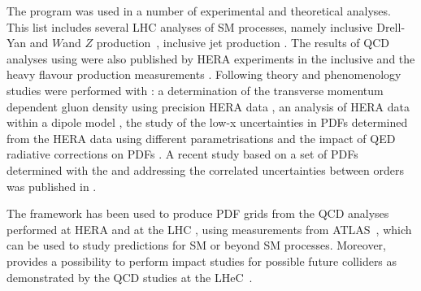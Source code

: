 The \fitter program was used in a number of experimental and theoretical analyses. 
This list includes several LHC analyses of SM processes, namely
inclusive Drell-Yan and $W$and $Z$ production~\cite{atlas:strange,atlas:hm,cms:strange},
inclusive jet production \cite{atlas:jets}.
The results of QCD analyses using \fitter were also
published by HERA experiments in the inclusive \cite{h1:2012kk} and
the heavy flavour production measurements \cite{h1zeus:charm, Abramowicz:2014zub}.
Following theory and phenomenology studies were performed with \fitter:
a determination of the transverse momentum dependent gluon density using precision HERA data \cite{Jung2014}, 
an analysis of HERA data within a dipole model \cite{Luszczak:2013rxa},
the study of the low-x uncertainties in PDFs determined from the HERA data using 
different parametrisations \cite{Chebyshev} and the impact of QED radiative corrections on PDFs \cite{Sadykov:2014aua}.
A recent study based on a set of PDFs determined with the \fitter and addressing 
the correlated uncertainties between orders was published in \cite{hfcorrpaper}. 
%

The \fitter framework has been used to produce PDF grids from the QCD analyses performed at 
HERA \cite{h1zeus:2009wt,hera:grids} and at the LHC \cite{atlas:grids}, using 
measurements from ATLAS~\cite{atlas:strange,atlas:jets}, which can be used to study predictions for SM 
or beyond SM processes.  Moreover, \fitter provides a possibility to 
perform impact studies for possible future colliders
as demonstrated by the QCD studies at the LHeC~\cite{lhec:studies}.







